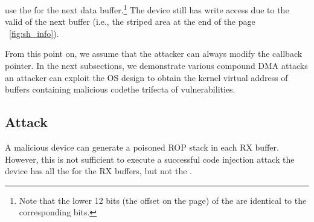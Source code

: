\begin{enumerate}[label=(\roman*),wide, labelwidth=!, labelindent=0pt]
use the \iova{} for the next data buffer.\footnote{Note that the lower 12 bits (\DIFaddbegin {}\DIFaddend the offset on the page) of the \iova{} are identical to the corresponding \kva{} bits.} The device still has write access due to the valid \iova of the next buffer (i.e., the striped area at the end of the page \DIFdelbegin {}\DIFdelend \DIFaddbegin {}\DIFaddend ~\ref{fig:sh_info}).
\end{enumerate}



From this point on, we assume that the attacker can always modify the callback pointer. In the next subsections, we demonstrate various compound DMA attacks \DIFdelbegin {}\DIFdelend \DIFaddbegin {}\DIFaddend an attacker can exploit the OS design to obtain the kernel virtual address of buffers containing malicious code\DIFdelbegin {}\DIFdelend \DIFaddbegin {}\DIFaddend the trifecta of vulnerabilities.

\subsection{\DIFdelbegin {}\DIFdelend \DIFaddbegin {}\DIFaddend \Compound{} Attack}\label{sec:ringflod}
A malicious device can generate a poisoned ROP stack in each RX buffer.
However, this is not sufficient to execute a successful code injection attack \DIFdelbegin {}\DIFdelend \DIFaddbegin {}\DIFaddend the device has all the \iova{} for the RX buffers, but not the \kva{}.


